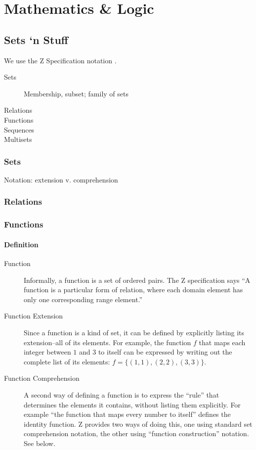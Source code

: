 \part{Mathematics \& Logic}

\chapter{Sets `n Stuff}

We use the Z Specification notation \cite{z-iso-13568}.

\begin{description}
\item [Sets] Membership, subset; family of sets
\item [Relations]
\item [Functions]
\item [Sequences]
\item [Multisets]
\end{description}

\section{Sets}

Notation: extension v. comprehension


\section{Relations}

\section{Functions}


\subsection{Definition}

\begin{description}
\item [Function] Informally, a function is a set of ordered pairs.
  The Z specification says ``A function is a particular form of
  relation, where each domain element has only one corresponding range
  element.''\cite{z-iso-13568}%
\item [Function Extension] Since a function is a kind of set, it can
  be defined by explicitly listing its extension--all of its elements.
  For example, the function $f$ that maps each integer between $1$ and
  $3$ to itself can be expressed by writing out the complete list of
  its elements: ${f=\{(1,1),(2,2),(3,3)\}}$.
\item [Function Comprehension] A second way of defining a function is
  to express the ``rule'' that determines the elements it contains,
  without listing them explicitly.  For example ``the function that
  maps every number to itself'' defines the identity function.  Z provides
  two ways of doing this, one using standard set comprehension
  notation, the other using ``function construction'' notation.  See
  below.
\end{description}

